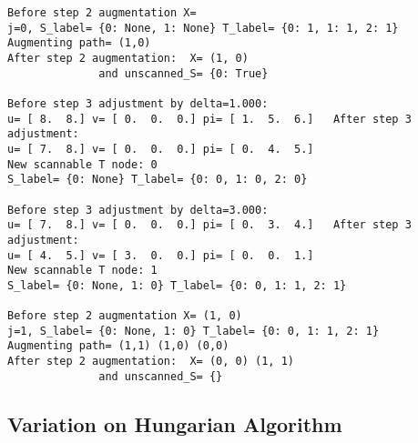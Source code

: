 \documentclass[12pt]{article}
\begin{document}
\begin{verbatim}
Before step 2 augmentation X= 
j=0, S_label= {0: None, 1: None} T_label= {0: 1, 1: 1, 2: 1}
Augmenting path= (1,0) 
After step 2 augmentation:  X= (1, 0) 
              and unscanned_S= {0: True}

Before step 3 adjustment by delta=1.000:
u= [ 8.  8.] v= [ 0.  0.  0.] pi= [ 1.  5.  6.]   After step 3 adjustment:
u= [ 7.  8.] v= [ 0.  0.  0.] pi= [ 0.  4.  5.]
New scannable T node: 0 
S_label= {0: None} T_label= {0: 0, 1: 0, 2: 0}

Before step 3 adjustment by delta=3.000:
u= [ 7.  8.] v= [ 0.  0.  0.] pi= [ 0.  3.  4.]   After step 3 adjustment:
u= [ 4.  5.] v= [ 3.  0.  0.] pi= [ 0.  0.  1.]
New scannable T node: 1 
S_label= {0: None, 1: 0} T_label= {0: 0, 1: 1, 2: 1}

Before step 2 augmentation X= (1, 0) 
j=1, S_label= {0: None, 1: 0} T_label= {0: 0, 1: 1, 2: 1}
Augmenting path= (1,1) (1,0) (0,0) 
After step 2 augmentation:  X= (0, 0) (1, 1) 
              and unscanned_S= {}
\end{verbatim}

\subsection{Variation on Hungarian Algorithm}
\label{sec:variation}
\end{document}
